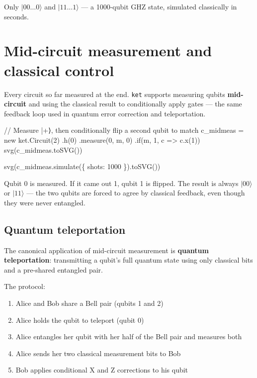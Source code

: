 \documentclass[
  11pt,
  letterpaper,
  oneside]{scrbook}
\newenvironment{Shaded}{\begin{snugshade}}{\end{snugshade}}
\newcommand{\NormalTok}[1]{\textcolor[rgb]{0.00,0.23,0.31}{#1}}
\providecommand{\tightlist}{%
  \setlength{\itemsep}{0pt}\setlength{\parskip}{0pt}}
\begin{document}
Only \(|00\ldots0\rangle\) and \(|11\ldots1\rangle\) --- a 1000-qubit
GHZ state, simulated classically in seconds.

\section{Mid-circuit measurement and classical
control}\label{mid-circuit-measurement-and-classical-control}

Every circuit so far measured at the end. \texttt{ket} supports
measuring qubits \textbf{mid-circuit} and using the classical result to
conditionally apply gates --- the same feedback loop used in quantum
error correction and teleportation.

\begin{Shaded}
\begin{Highlighting}[]
\NormalTok{// Measure |+⟩, then conditionally flip a second qubit to match}
\NormalTok{c\_midmeas = new ket.Circuit(2)}
\NormalTok{  .h(0)}
\NormalTok{  .measure(0, \textquotesingle{}m\textquotesingle{}, 0)}
\NormalTok{  .if(\textquotesingle{}m\textquotesingle{}, 1, c =\textgreater{} c.x(1))}
\NormalTok{svg(c\_midmeas.toSVG())}
\end{Highlighting}
\end{Shaded}

\begin{Shaded}
\begin{Highlighting}[]
\NormalTok{svg(c\_midmeas.simulate(\{ shots: 1000 \}).toSVG())}
\end{Highlighting}
\end{Shaded}

Qubit 0 is measured. If it came out 1, qubit 1 is flipped. The result is
always \(|00\rangle\) or \(|11\rangle\) --- the two qubits are forced to
agree by classical feedback, even though they were never entangled.

\subsection{Quantum teleportation}\label{quantum-teleportation}

The canonical application of mid-circuit measurement is \textbf{quantum
teleportation}: transmitting a qubit's full quantum state using only
classical bits and a pre-shared entangled pair.

The protocol:

\begin{enumerate}
\def\labelenumi{\arabic{enumi}.}
\tightlist
\item
  Alice and Bob share a Bell pair (qubits 1 and 2)
\item
  Alice holds the qubit to teleport (qubit 0)
\item
  Alice entangles her qubit with her half of the Bell pair and measures
  both
\item
  Alice sends her two classical measurement bits to Bob
\item
  Bob applies conditional X and Z corrections to his qubit
\end{enumerate}
\end{document}
